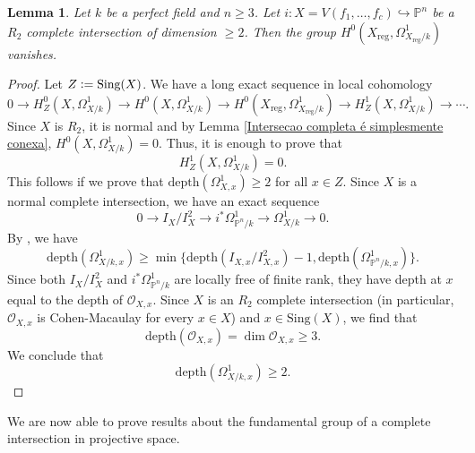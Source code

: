 \documentclass[a4paper,12pt]{amsart}
\newtheorem{lemma}[definition]{Lemma}
\numberwithin{equation}{section}
\newcommand{\defeq}{\vcentcolon=}
\renewcommand{\geq}{\geqslant}
\renewcommand{\_}{\rule{0.25cm}{0.4pt}}
\begin{document}
\begin{lemma}\label{reg}
    Let $k$ be a perfect field and $n\geq 3$. Let $i\colon X=V(f_{1},\dots,f_{c})\hookrightarrow \mathbb{P}^{n}$ be a $R_{2}$ complete intersection of dimension $\geq 2$. Then the group $H^{0}(X_{\text{reg}},\Omega^{1}_{X_{\text{reg}}/k})$ vanishes.
\end{lemma}
\begin{proof}
Let $Z\defeq \text{Sing}(X)$. We have a long exact sequence in local cohomology
\[
0\to H^{0}_{Z}(X,\Omega^{1}_{X/k})\to H^{0}(X,\Omega^{1}_{X/k})\to H^{0}(X_{\text{reg}},\Omega^{1}_{X_{\text{reg}}/k})\to H^{1}_{Z}(X,\Omega^{1}_{X/k})\to\cdots.
\]
Since $X$ is $R_{2}$, it is normal and by Lemma \ref{Intersecao completa é simplesmente conexa}, $H^{0}(X,\Omega^{1}_{X/k})=0$. Thus, it is enough to prove that 
\[
H^{1}_{Z}(X,\Omega^{1}_{X/k})=0.
\]
This follows if we prove that $\text{depth}(\Omega^{1}_{X,x})\geq 2$ for all $x\in Z$. Since $X$ is a normal complete intersection, we have an exact sequence
\[
0\to I_{X}/I_{X}^{2}\to i^{\ast}\Omega^1_{\mathbb{P}^{n}/k}\to \Omega^{1}_{X/k}\to 0.
\]
By \cite[\href{https://stacks.math.columbia.edu/tag/00LX}{Tag 00LX}]{stacks-project}, we have
\[
\text{depth}(\Omega^{1}_{X/k,x})\geq \min\{\text{depth}(I_{X,x}/I_{X,x}^{2})-1,\text{depth}(\Omega^1_{\mathbb{P}^{n}/k,x})\}.
\]
Since both $I_{X}/I_{X}^{2}$ and $i^{\ast}\Omega^{1}_{\mathbb{P}^{n}/k}$ are locally free of finite rank, they have depth at $x$ equal to the depth of $\mathcal{O}_{X,x}$. Since $X$ is an $R_{2}$ complete intersection (in particular, $\mathcal{O}_{X,x}$ is Cohen-Macaulay for every $x\in X$) and $x\in \text{Sing}(X)$, we find that
\[
\text{depth}(\mathcal{O}_{X,x})=\dim\mathcal{O}_{X,x}\geq 3.
\]
We conclude that
\[
\text{depth}(\Omega^{1}_{X/k,x})\geq 2.
\]
\end{proof}

We are now able to prove results about the fundamental group of a complete intersection in projective space.
\end{document}
